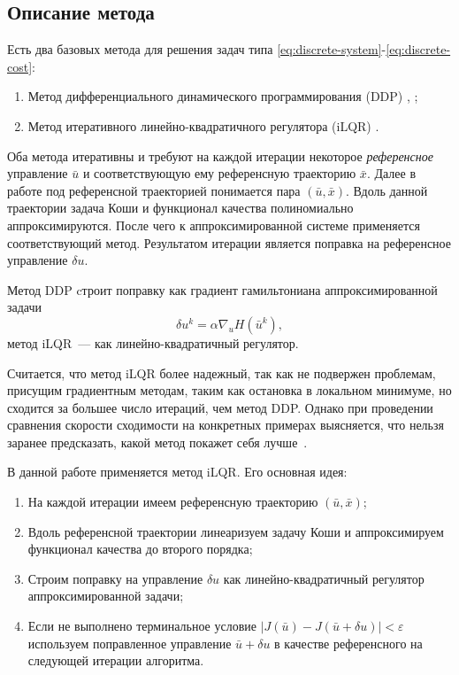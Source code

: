 \documentclass[../../doc.tex]{subfiles}
\begin{document}
    \subsection{Описание метода}

    Есть два базовых метода для решения задач типа \eqref{eq:discrete-system}-\eqref{eq:discrete-cost}:
    \begin{enumerate}\itemsep0em
        \item Метод дифференциального динамического программирования (DDP) \cite{mayne1966}, \cite{murray1984};
        \item Метод итеративного линейно-квадратичного регулятора (iLQR) \cite{li2004}.
    \end{enumerate}
    Оба метода итеративны и требуют на каждой итерации некоторое \textit{референсное} управление $\bar u$ и соответствующую ему референсную траекторию $\bar x$.
    Далее в работе под референсной траекторией понимается пара $(\bar u, \bar x)$.
    Вдоль данной траектории задача Коши и функционал качества полиномиально аппроксимируются.
    После чего к аппроксимированной системе применяется соответствующий метод.
    Результатом итерации является поправка на референсное управление $\delta u$.
    
    Метод DDP cтроит поправку как градиент гамильтониана аппроксимированной задачи
    $$
        \delta u^k = \alpha \nabla_u H(\bar u^k),
    $$
    метод iLQR~--- как линейно-квадратичный регулятор.

    Считается, что метод iLQR более надежный, так как не подвержен проблемам, присущим градиентным методам, таким как остановка в локальном минимуме,
    но сходится за большее число итераций, чем метод DDP.
    Однако при проведении сравнения скорости сходимости на конкретных примерах выясняется, что нельзя заранее предсказать, какой метод покажет себя лучше~\cite{manchester2016}.

    В данной работе применяется метод iLQR. Его основная идея:
    \begin{enumerate}\itemsep0em
        \item На каждой итерации имеем референсную траекторию $(\bar u, \bar x)$;
        \item Вдоль референсной траектории линеаризуем задачу Коши и аппроксимируем функционал качества до второго порядка;
        \item Строим поправку на управление $\delta u$ как линейно-квадратичный регулятор аппроксимированной задачи;
        \item Если не выполнено терминальное условие $|J(\bar u) - J(\bar u + \delta u)| < \varepsilon$ используем поправленное управление $\bar u + \delta u$ в качестве референсного на следующей итерации алгоритма.
    \end{enumerate}

    \ifSubfilesClassLoaded{
        \nocite{*}
        \clearpage
        
        
    }{}
\end{document}
